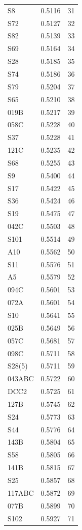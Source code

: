 \begin{longtable}{lrr}
  S8 & 0.5116 & 31 \\
  S72 & 0.5127 & 32 \\
  S82 & 0.5139 & 33 \\
  S69 & 0.5164 & 34 \\
  S28 & 0.5185 & 35 \\
  S74 & 0.5186 & 36 \\
  S79 & 0.5204 & 37 \\
  S65 & 0.5210 & 38 \\
  019B & 0.5217 & 39 \\
  058C & 0.5228 & 40 \\
  S37 & 0.5228 & 41 \\
  121C & 0.5235 & 42 \\
  S68 & 0.5255 & 43 \\
  S9 & 0.5400 & 44 \\
  S17 & 0.5422 & 45 \\
  S36 & 0.5424 & 46 \\
  S19 & 0.5475 & 47 \\
  042C & 0.5503 & 48 \\
  S101 & 0.5514 & 49 \\
  A10 & 0.5562 & 50 \\
  S11 & 0.5576 & 51 \\
  A5 & 0.5579 & 52 \\
  094C & 0.5601 & 53 \\
  072A & 0.5601 & 54 \\
  S10 & 0.5641 & 55 \\
  025B & 0.5649 & 56 \\
  057C & 0.5681 & 57 \\
  098C & 0.5711 & 58 \\
  S28(5) & 0.5711 & 59 \\
  043ABC & 0.5722 & 60 \\
  DCC2 & 0.5725 & 61 \\
  127B & 0.5745 & 62 \\
  S24 & 0.5773 & 63 \\
  S44 & 0.5776 & 64 \\
  143B & 0.5804 & 65 \\
  S58 & 0.5805 & 66 \\
  141B & 0.5815 & 67 \\
  S25 & 0.5857 & 68 \\
  117ABC & 0.5872 & 69 \\
  077B & 0.5899 & 70 \\
  S102 & 0.5927 & 71 \\

\end{longtable}
